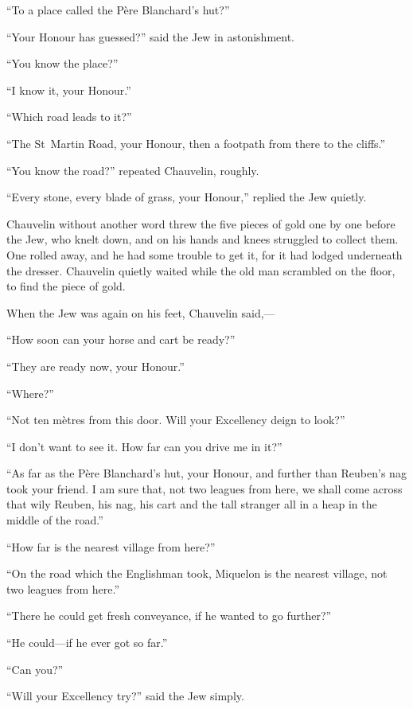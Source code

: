 \enquote{To a place called the Père Blanchard's hut?}

\enquote{Your Honour has guessed?} said the Jew in astonishment.

\enquote{You know the place?}

\enquote{I know it, your Honour.}

\enquote{Which road leads to it?}

\enquote{The St~Martin Road, your Honour, then a footpath from there to the cliffs.}

\enquote{You know the road?} repeated Chauvelin, roughly.

\enquote{Every stone, every blade of grass, your Honour,} replied the Jew quietly.

Chauvelin without another word threw the five pieces of gold one by one before the Jew, who knelt down, and on his hands and knees struggled to collect them. One rolled away, and he had some trouble to get it, for it had lodged underneath the dresser. Chauvelin quietly waited while the old man scrambled on the floor, to find the piece of gold.

When the Jew was again on his feet, Chauvelin said,---

\enquote{How soon can your horse and cart be ready?}

\enquote{They are ready now, your Honour.}

\enquote{Where?}

\enquote{Not ten mètres from this door. Will your Excellency deign to look?}

\enquote{I don't want to see it. How far can you drive me in it?}

\enquote{As far as the Père Blanchard's hut, your Honour, and further than Reuben's nag took your friend. I am sure that, not two leagues from here, we shall come across that wily Reuben, his nag, his cart and the tall stranger all in a heap in the middle of the road.}

\enquote{How far is the nearest village from here?}

\enquote{On the road which the Englishman took, Miquelon is the nearest village, not two leagues from here.}

\enquote{There he could get fresh conveyance, if he wanted to go further?}

\enquote{He could---if he ever got so far.}

\enquote{Can you?}

\enquote{Will your Excellency try?} said the Jew simply.


